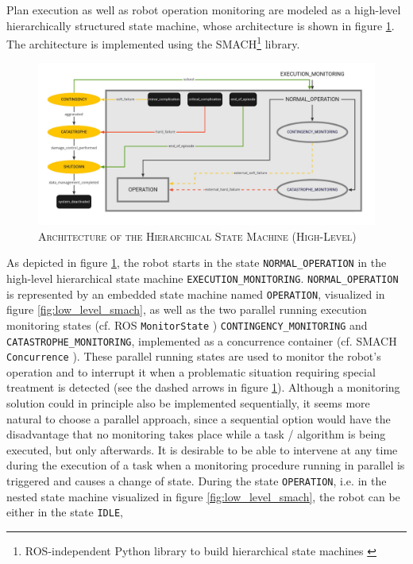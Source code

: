 \documentclass[english, master, utf8]{base/thesis_KBS}
\newcommand{\code}[1]{\colorbox{light-gray}{\texttt{#1}}}
\begin{document}
Plan execution as well as robot operation monitoring are modeled as a high-level hierarchically structured state machine, whose architecture is shown
in figure \ref{fig:high_level_smach}. The architecture is implemented using the SMACH\footnote{ROS-independent Python library to build hierarchical state machines \cite{smach}} 
library.
\begin{figure}[H]
    \centering
    \includegraphics[width=\textwidth]{pics/SMACH_high_level.jpg}
    \caption{\textsc{Architecture of the Hierarchical State Machine (High-Level)}}
    \label{fig:high_level_smach}
\end{figure}
\noindent
As depicted in figure \ref{fig:high_level_smach}, the robot starts in the state \code{NORMAL\_OPERATION} in the high-level hierarchical state machine \code{EXECUTION\_MONITORING}.
\code{NORMAL\_OPERATION} is represented by an embedded state machine named \code{OPERATION}, visualized in figure \ref{fig:low_level_smach}, as well as the two
parallel running execution monitoring states (cf. ROS \code{MonitorState} \cite{monitor_state}) \code{CONTINGENCY\_MONITORING} and \code{CATASTROPHE\_MONITORING}, 
implemented as a concurrence container (cf. SMACH \code{Concurrence} \cite{concurrence_container}).
These parallel running states are used to monitor the robot's operation and to interrupt it when a problematic situation requiring special treatment is detected
(see the dashed arrows in figure \ref{fig:high_level_smach}).
Although a monitoring solution could in principle also be implemented sequentially, it seems more natural to choose a parallel approach, since a sequential option
would have the disadvantage that no monitoring takes place while a task / algorithm is being executed, but only afterwards.
It is desirable to be able to intervene at any time during the execution of a task when a monitoring procedure running in parallel is triggered and causes a change of state.
During the state \code{OPERATION}, i.e. in the nested state machine visualized in figure \ref{fig:low_level_smach}, the robot can be either in the state \code{IDLE}, 
\end{document}
